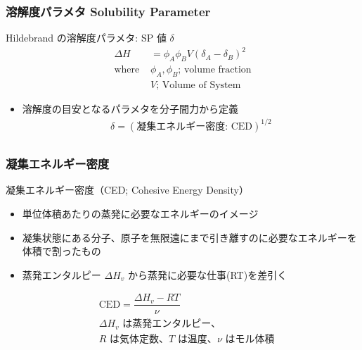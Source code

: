 \documentclass[12pt, dvipdfmx]{beamer}
\begin{document}
\begin{frame}
	\frametitle{溶解度パラメタ Solubility Parameter}
		\begin{block}{Hildebrand の溶解度パラメタ: SP 値 $\delta$}
			\vspace{-1\baselineskip}
			\begin{align*}
				\Delta H &= \phi_A \phi_B V (\delta_A -\delta_B)^2 \\
				\text{where }& \phi_A, \phi_B \text{; volume fraction}\\
				& V \text{; Volume of System}
			\end{align*}
			\vspace{-1\baselineskip}
			\begin{itemize}
				\item 溶解度の目安となるパラメタを分子間力から定義
				\vspace{-.5\baselineskip}
				\begin{align*}
					\delta = (\text{凝集エネルギー密度: CED})^{1/2} \\
				\end{align*}
			\end{itemize}
			\vspace{-8mm}
			\centering
		\end{block}
\end{frame}

\begin{frame}
	\frametitle{凝集エネルギー密度}
		\begin{exampleblock}{凝集エネルギー密度（CED; Cohesive Energy Density）}
			\begin{itemize}
				\item 単位体積あたりの蒸発に必要なエネルギーのイメージ
				\item 凝集状態にある分子、原子を無限遠にまで引き離すのに必要なエネルギーを体積で割ったもの
				\item 蒸発エンタルピー $\Delta H_v$ から蒸発に必要な仕事(RT)を差引く
			\end{itemize}
			\vspace{-1\baselineskip}
			\begin{align*}
				&\text{CED} = \dfrac{\Delta H_v - RT}{\nu}\\
				&\text{$\Delta H_v$ は蒸発エンタルピー、}\\
				&\text{$R$ は気体定数、$T$ は温度、$\nu$ はモル体積}
			\end{align*}
		\end{exampleblock}
\end{frame}
\end{document}
